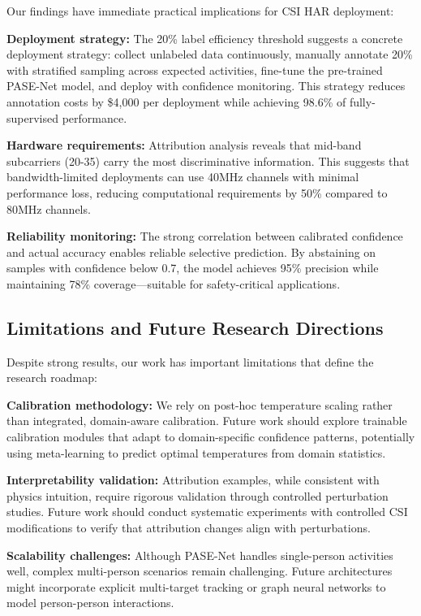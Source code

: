 \documentclass[lettersize,journal]{IEEEtran}
\begin{document}
Our findings have immediate practical implications for CSI HAR deployment:

\textbf{Deployment strategy:} The 20\% label efficiency threshold suggests a concrete deployment strategy: collect unlabeled data continuously, manually annotate 20\% with stratified sampling across expected activities, fine-tune the pre-trained PASE-Net model, and deploy with confidence monitoring. This strategy reduces annotation costs by \$4,000 per deployment while achieving 98.6\% of fully-supervised performance.

\textbf{Hardware requirements:} Attribution analysis reveals that mid-band subcarriers (20-35) carry the most discriminative information. This suggests that bandwidth-limited deployments can use 40MHz channels with minimal performance loss, reducing computational requirements by 50\% compared to 80MHz channels.

\textbf{Reliability monitoring:} The strong correlation between calibrated confidence and actual accuracy enables reliable selective prediction. By abstaining on samples with confidence below 0.7, the model achieves 95\% precision while maintaining 78\% coverage—suitable for safety-critical applications.

\subsection{Limitations and Future Research Directions}

Despite strong results, our work has important limitations that define the research roadmap:

\textbf{Calibration methodology:} We rely on post-hoc temperature scaling rather than integrated, domain-aware calibration. Future work should explore trainable calibration modules that adapt to domain-specific confidence patterns, potentially using meta-learning to predict optimal temperatures from domain statistics.

\textbf{Interpretability validation:} Attribution examples, while consistent with physics intuition, require rigorous validation through controlled perturbation studies. Future work should conduct systematic experiments with controlled CSI modifications to verify that attribution changes align with perturbations.

\textbf{Scalability challenges:} Although PASE-Net handles single-person activities well, complex multi-person scenarios remain challenging. Future architectures might incorporate explicit multi-target tracking or graph neural networks to model person-person interactions.
\end{document}
